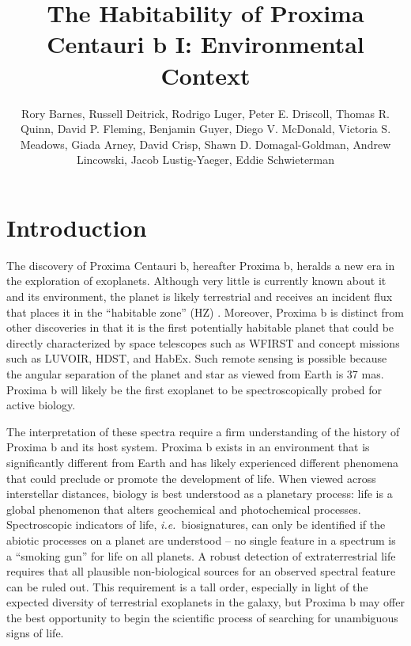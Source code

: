 \documentclass[preprint,12pt]{aastex}
\def\ie{{\it i.e.\ }}
\begin{document}
\title{The Habitability of Proxima Centauri b I: Environmental Context}
\author{Rory Barnes, Russell Deitrick, Rodrigo Luger, Peter E. Driscoll, Thomas R. Quinn, David P. Fleming, Benjamin Guyer, Diego V. McDonald, Victoria S. Meadows, Giada Arney, David Crisp, Shawn D. Domagal-Goldman, Andrew Lincowski, Jacob Lustig-Yaeger, Eddie Schwieterman}

\begin{abstract}
\end{abstract}

\section{Introduction\label{sec:intro}}

The discovery of Proxima Centauri b, hereafter Proxima b, heralds a
new era in the exploration of exoplanets. Although very little is
currently known about it and its environment, the planet is likely
terrestrial and receives an incident flux that places it in the
``habitable zone'' (HZ)
\citep{Kasting93,Selsis07,Kopparapu13}. Moreover, Proxima b is
distinct from other discoveries in that it is the first potentially
habitable planet that could be directly characterized by space
telescopes such as WFIRST and concept missions such as LUVOIR, HDST,
and HabEx. Such remote sensing is possible because the angular
separation of the planet and star as viewed from Earth is
37 mas. Proxima b will likely be the first exoplanet to be
spectroscopically probed for active biology.

The interpretation of these spectra require a firm understanding of
the history of Proxima b and its host system. Proxima b exists in an
environment that is significantly different from Earth and has likely
experienced different phenomena that could preclude or promote the
development of life. When viewed across interstellar distances,
biology is best understood as a planetary process: life is a global
phenomenon that alters geochemical and photochemical
processes. Spectroscopic indicators of life, \ie biosignatures, can
only be identified if the abiotic processes on a planet are understood
-- no single feature in a spectrum is a ``smoking gun'' for life on
all planets. A robust detection of extraterrestrial life requires that
all plausible non-biological sources for an observed spectral
feature can be ruled out. This requirement is a tall order,
especially in light of the expected diversity of terrestrial
exoplanets in the galaxy, but Proxima b may offer the best opportunity
to begin the scientific process of searching for unambiguous signs of
life.
\end{document}
